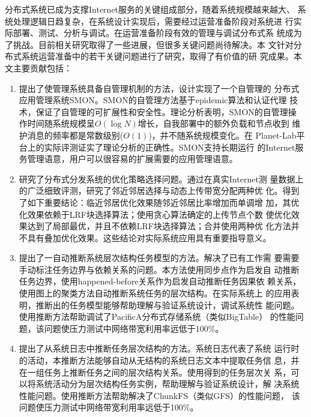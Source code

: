 \begin{cabstract}


  分布式系统已成为支撑Internet服务的关键组成部分，随着系统规模越来越大、
  系统处理逻辑日趋复杂，在系统设计实现后，需要经过运营准备阶段对系统进
  行实际部署、测试、分析与调试。在运营准备阶段有效的管理与调试分布式系
  统成为了挑战。目前相关研究取得了一些进展，但很多关键问题尚待解决。本
  文针对分布式系统运营准备中的若干关键问题进行了研究，取得了有价值的研
  究成果。本文主要贡献包括：

  \begin{enumerate}

    \item 提出了使管理系统具备自管理机制的方法，设计实现了一个自管理的
    分布式应用管理系统SMON。SMON的自管理方法基于epidemic算法和认证代理
    技术，保证了自管理的可扩展性和安全性。理论分析表明，SMON的自管理操
    作时间随系统规模呈$O(\log N)$增长，自我部署中的额外负载和节点收到
    维护消息的频率都是常数级别($O(1)$)，并不随系统规模变化。在
    Planet-Lab平台上的实际评测证实了理论分析的正确性。SMON支持长期运行
    的Internet服务管理语意，用户可以很容易的扩展需要的应用管理语意。

    \item 研究了分布式分发系统的优化策略选择问题。通过在真实Internet测
    量数据上的广泛细致评测，研究了邻近邻居选择与动态上传带宽分配两种优
    化。得到了如下重要结论：临近邻居优化效果随邻近邻居比率增加而单调增
    加，其优化效果依赖于LRF块选择算法；使用贪心算法确定的上传节点个数
    使优化效果达到了局部最优，并且不依赖LRF块选择算法；合并使用两种优
    化方法并不具有叠加优化效果。这些结论对实际系统应用具有重要指导意义。

    \item 提出了一自动推断系统层次结构任务模型的方法。解决了已有工作需
    要需要手动标注任务边界与依赖关系的问题。本方法使用同步点作为启发自
    动推断任务边界，使用happened-before关系作为启发自动推断任务因果依
    赖关系，使用图上的聚类方法自动推断系统任务的层次结构。在实际系统上
    的应用表明，推断出的任务模型能够帮助理解与验证系统设计，调试系统性
    能问题。使用推断方法帮助调试了PacificA分布式存储系统（类似BigTable）
    的性能问题，该问题使压力测试中网络带宽利用率远低于100\%。

    \item 提出了从系统日志中推断任务层次结构的方法。系统日志代表了系统
    运行时的活动，本推断方法能够自动从无结构的系统日志文本中提取任务信
    息，并在一组任务上推断任务之间的层次结构关系。使用得到的任务层次关
    系，可以将系统活动分为层次结构任务实例，帮助理解与验证系统设计，解
    决系统性能问题。使用推断方法帮助解决了ChunkFS（类似GFS）的性能问题，
    该问题使压力测试中网络带宽利用率远低于100\%。

  \end{enumerate}

\end{cabstract}

